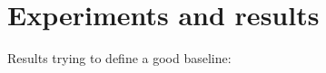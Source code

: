 \chapter{Experiments and results} \label{sec:experiments-and-results}

Results trying to define a good baseline:
\begin{comment}

\begin{table}[h!]
  \centering
  \begin{tabular}{|c|c|c|c|c|c|c|c|}
    \hline
    & \multicolumn{2}{c|}{\textbf{Method}} & \multicolumn{3}{c|}{\textbf{Metrics}} & \multicolumn{2}{c|}{\textbf{Performance}} \\ \cline{2-8} 
    \textbf{Exp.} & \textbf{Name} & \textbf{Method} & \textbf{PSNR} & \textbf{SSIM} & \textbf{LPIPS} & \textbf{Num Rays per Sec} & \textbf{FPS} \\ 
    \textbf{ID} & & & & & & & \\ \hline
    0 & exp\_image\_size-0 & nerfacto & 23.35 & 0.75 & 0.08 & 389663 & 12.99 \\ \hline
    1 & exp\_image\_size-1 & nerfacto & 23.61 & 0.78 & 0.10 & 458438 & 3.82 \\ \hline
    2 & exp\_image\_size-2 & nerfacto & 23.24 & 0.76 & 0.17 & 494213 & 1.03 \\ \hline
    3 & exp\_image\_size-3 & nerfacto & 23.07 & 0.73 & 0.23 & 513221 & 0.48 \\ \hline
    4 & exp\_image\_size-4 & nerfacto & 22.82 & 0.73 & 0.27 & 522610 & 0.27 \\ \hline
  \end{tabular}
  \caption{Experimental results for different image sizes and rendering methods.}
  \label{tab:exp_results}
\end{table}

\begin{table}[h!]
  \centering
  \begin{tabular}{|c|c|c|c|c|c|c|c|}
    \hline
    & \multicolumn{2}{c|}{\textbf{Method}} & \multicolumn{3}{c|}{\textbf{Metrics}} & \multicolumn{2}{c|}{\textbf{Performance}} \\ \cline{2-8} 
    \textbf{Exp.} & \textbf{Name} & \textbf{Method} & \textbf{PSNR} & \textbf{SSIM} & \textbf{LPIPS} & \textbf{Num Rays per Sec} & \textbf{FPS} \\ 
    \textbf{ID} & & & & & & & \\ \hline
    0 & exp\_speed-0 & nerfacto & 24.06 & 0.78 & 0.18 & 526011 & 1.95 \\ \hline
    1 & exp\_speed-1 & nerfacto & 23.50 & 0.76 & 0.18 & 503773 & 1.87 \\ \hline
    2 & exp\_speed-2 & nerfacto & 23.41 & 0.74 & 0.19 & 504456 & 1.87 \\ \hline
    3 & exp\_speed-3 & nerfacto & 22.72 & 0.71 & 0.20 & 500471 & 1.85 \\ \hline
  \end{tabular}
  \caption{Experimental results for different speed configurations and rendering methods.}
  \label{tab:exp_results}
\end{table}


\end{comment}
